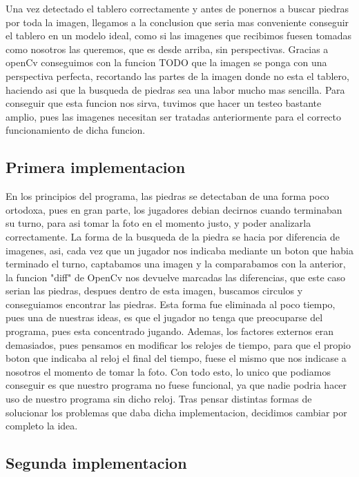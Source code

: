 \documentclass[12pt,a4paper]{report}
\begin{document}
Una vez detectado el tablero correctamente y antes de ponernos a buscar piedras por toda la imagen, llegamos a la conclusion que seria mas conveniente conseguir el tablero en un modelo ideal, como si las imagenes que recibimos fuesen tomadas como nosotros las queremos, que es desde arriba, sin perspectivas. 
Gracias a openCv conseguimos con la funcion TODO que la imagen se ponga con una perspectiva perfecta, recortando las partes de la imagen donde no esta el tablero, haciendo asi que la busqueda de piedras sea una labor mucho mas sencilla. 
Para conseguir que esta funcion nos sirva, tuvimos que hacer un testeo bastante amplio, pues las imagenes necesitan ser tratadas anteriormente para el correcto funcionamiento de dicha funcion.

\subsection{Primera implementacion}%

En los principios del programa, las piedras se detectaban de una forma poco ortodoxa, pues en gran parte, los jugadores debian decirnos cuando terminaban su turno, para asi tomar la foto en el momento justo, y poder analizarla correctamente.
La forma de la busqueda de la piedra se hacia por diferencia de imagenes, asi, cada vez que un jugador nos indicaba mediante un boton que habia terminado el turno, captabamos una imagen y la comparabamos con la anterior, la funcion "diff" de OpenCv nos devuelve marcadas las diferencias, que este caso serian las piedras, despues dentro de esta imagen, buscamos circulos y conseguiamos encontrar las piedras. 
Esta forma fue eliminada al poco tiempo, pues una de nuestras ideas, es que el jugador no tenga que preocuparse del programa, pues esta concentrado jugando. Ademas, los factores externos eran demasiados, pues pensamos en modificar los relojes de tiempo, para que el propio boton que indicaba al reloj el final del tiempo, fuese el mismo que nos indicase a nosotros el momento de tomar la foto. Con todo esto, lo unico que podiamos conseguir es que nuestro programa no fuese funcional, ya que nadie podria hacer uso de nuestro programa sin dicho reloj. Tras pensar distintas formas de solucionar los problemas que daba dicha implementacion, decidimos cambiar por completo la idea.

\subsection{Segunda implementacion} %
\end{document}
